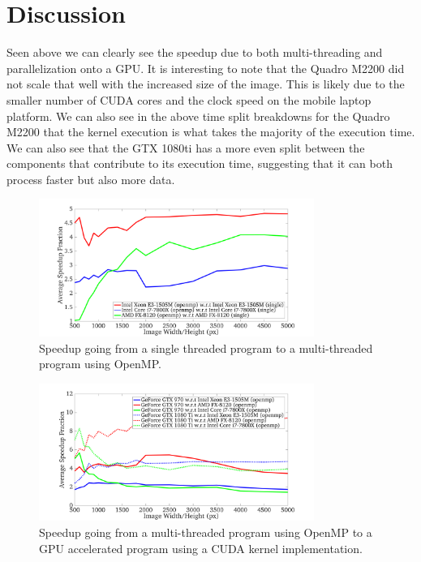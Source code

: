 \documentclass{article}
\begin{document}
\section{Discussion}

Seen above we can clearly see the speedup due to both multi-threading and parallelization onto a GPU.
It is interesting to note that the Quadro M2200 did not scale that well with the increased size of the image.
This is likely due to the smaller number of CUDA cores and the clock speed on the mobile laptop platform.
We can also see in the above time split breakdowns for the Quadro M2200 that the kernel execution is what takes the majority of the execution time.
We can also see that the GTX 1080ti has a more even split between the components that contribute to its execution time, suggesting that it can both process faster but also more data.


\begin{figure}[H]
\centering
\includegraphics[width=0.8\textwidth]{fig_results/plot_speedup_cpus.png}
\caption{Speedup going from a single threaded program to a multi-threaded program using OpenMP.}
\end{figure}

\begin{figure}[H]
\centering
\includegraphics[width=0.8\textwidth]{fig_results/plot_speedup_gpus.png}
\caption{Speedup going from a multi-threaded program using OpenMP to a GPU accelerated program using a CUDA kernel implementation.}
\end{figure}
\end{document}
